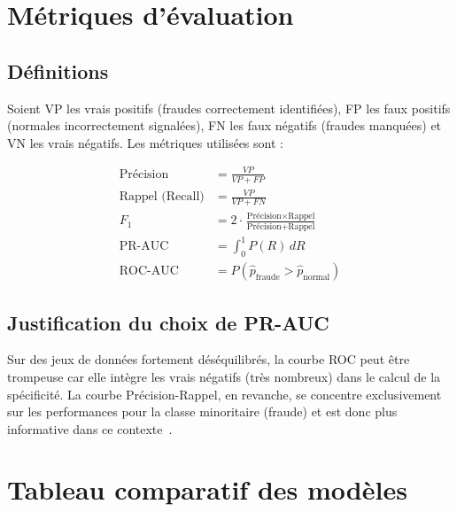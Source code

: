 \documentclass[12pt,a4paper,twoside]{report}
\theoremstyle{definition}
\begin{document}
\section{Métriques d'évaluation}

\subsection{Définitions}

Soient VP les vrais positifs (fraudes correctement identifiées), FP les faux positifs
(normales incorrectement signalées), FN les faux négatifs (fraudes manquées) et
VN les vrais négatifs. Les métriques utilisées sont :

\begin{align}
\text{Précision} &= \frac{VP}{VP + FP} \label{eq:precision} \\[4pt]
\text{Rappel (Recall)} &= \frac{VP}{VP + FN} \label{eq:recall} \\[4pt]
F_1 &= 2 \cdot \frac{\text{Précision} \times \text{Rappel}}{\text{Précision} + \text{Rappel}} \label{eq:f1} \\[4pt]
\text{PR-AUC} &= \int_0^1 P(R) \, dR \label{eq:prauc} \\[4pt]
\text{ROC-AUC} &= P(\hat{p}_{\text{fraude}} > \hat{p}_{\text{normal}}) \label{eq:rocauc}
\end{align}

\subsection{Justification du choix de PR-AUC}

Sur des jeux de données fortement déséquilibrés, la courbe ROC peut être trompeuse
car elle intègre les vrais négatifs (très nombreux) dans le calcul de la spécificité.
La courbe Précision-Rappel, en revanche, se concentre exclusivement sur les
performances pour la classe minoritaire (fraude) et est donc plus informative
dans ce contexte~\cite{davis2006relationship,saito2015precision}.

\section{Tableau comparatif des modèles}
\end{document}
